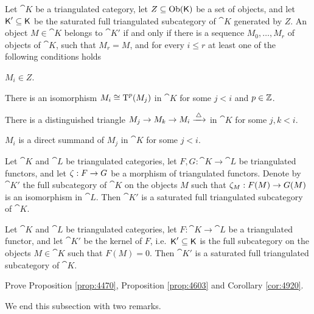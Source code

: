 \begin{prop} \label{prop:4470}
Let $\cat{K}$ be a triangulated category, let $Z \subseteq \operatorname{Ob}(\operatorname{\mathsf{K}})$ 
be a set of objects, and let $\operatorname{\mathsf{K}}' \subseteq \operatorname{\mathsf{K}}$ be the saturated full 
triangulated subcategory of $\cat{K}$ generated by $Z$. An object 
$M \in \cat{K}$ belongs to $\cat{K}'$ if 
and only if there is a sequence $M_0, \ldots, M_r$ of objects of $\cat{K}$, 
such that $M_r = M$, and for every $i \leq r$ at least one of the following 
conditions holds\tup{:}
\begin{itemize}
 $M_i \in Z$. 

 There is an isomorphism $M_i \cong \operatorname{T}^p(M_j)$ in $\cat{K}$
for some $j < i$ and $p \in \mathbb{Z}$. 

 There is a distinguished triangle 
$M_j \to M_k \to M_i \xrightarrow{\, \triangle\, }$
in $\cat{K}$ for some $j, k < i$.

 $M_i$ is a direct summand of $M_j$ in $\cat{K}$ for some $j < i$.
\end{itemize}
\end{prop}

\begin{prop} \label{prop:4603}
Let $\cat{K}$ and $\cat{L}$ be triangulated categories, 
let $F, G : \cat{K} \to \cat{L}$ be triangulated functors, and let 
$\zeta : F \to G$ be a morphism of triangulated functors. 
Denote by $\cat{K}'$ the full subcategory of $\cat{K}$ on the objects
$M$ such that $\zeta_M : F(M) \to G(M)$ is an isomorphism in $\cat{L}$.
Then $\cat{K}'$ is a saturated full triangulated subcategory of $\cat{K}$. 
\end{prop}

\begin{cor} \label{cor:4920}
Let $\cat{K}$ and $\cat{L}$ be triangulated categories, 
let $F : \cat{K} \to \cat{L}$ be a triangulated functor, and let
$\cat{K}'$ be the kernel of $F$, i.e.\ $\operatorname{\mathsf{K}}' \subseteq \operatorname{\mathsf{K}}$ is the 
full subcategory on the objects $M \in \cat{K}$ such that $F(M) = 0$. 
Then $\cat{K}'$ is a saturated full triangulated subcategory of $\cat{K}$.
\end{cor}

\begin{exer} \label{exer:4603}
Prove Proposition \ref{prop:4470}, Proposition \ref{prop:4603}  and Corollary 
\lb \ref{cor:4920}. 
\end{exer}

We end this subsection with two remarks. 

